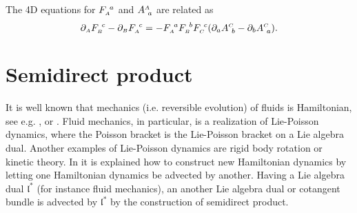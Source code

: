 \documentclass[
10pt, %
a4paper, %
oneside, %
headinclude,footinclude, %
BCOR5mm, %
]{scrartcl}
\newcommand{\MP}[1]{{\color{Green}MP:\ \ #1}}
\newcommand{\IP}[1]{{\color{Red}IP:\ \ #1}}
\newcommand{\sA}{\mathsmaller A}
\newcommand{\sB}{\mathsmaller B}
\newcommand{\pd}{\partial}
\newcommand{\F}[2]{F^{\ #1}_{\mathsmaller#2}}
\newcommand{\A}[2]{A^{\mathsmaller#1}_{\ #2}}
\newcommand{\LA}{\mathfrak{l}}
\begin{document}
\begin{remark}
The 4D equations for $ \F{a}{A} $ and $ \A{A}{a} $ are related as
\begin{equation}
\pd_\sA \F{c}{B} - \pd_\sB \F{c}{A} = -\F{a}{A}\F{b}{B}\F{c}{C}(\pd_a\A{C}{b} - \pd_b\A{C}{a}).
\end{equation}
\end{remark}




\section{Semidirect product}\label{sec.SP}
It is well known that mechanics (i.e. reversible evolution) of fluids is Hamiltonian, see e.g. \cite{Arnold}, \cite{Marsden-Ratiu-Weinstein} or \cite{PKG}. Fluid mechanics, in particular, is a realization of Lie-Poisson dynamics, where the Poisson bracket is the Lie-Poisson bracket on a Lie algebra dual. Another examples of Lie-Poisson dynamics are rigid body rotation or kinetic theory. In \cite{Marsden-Ratiu-Weinstein} it is explained how to construct new Hamiltonian dynamics by letting one Hamiltonian dynamics be advected by another. Having a Lie algebra dual $\LA^*$ (for instance fluid mechanics), an another Lie algebra dual or cotangent bundle is advected by $\LA^*$ by the construction of semidirect product. 
\end{document}
